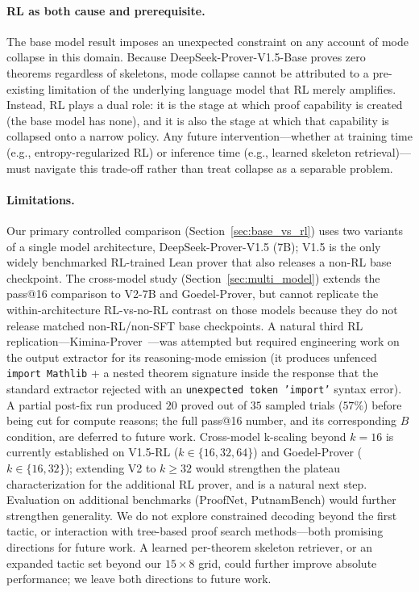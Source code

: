 \documentclass{article}
\begin{document}
\paragraph{RL as both cause and prerequisite.}
The base model result imposes an unexpected constraint on any account of mode collapse in this domain. Because DeepSeek-Prover-V1.5-Base proves zero theorems regardless of skeletons, mode collapse cannot be attributed to a pre-existing limitation of the underlying language model that RL merely amplifies. Instead, RL plays a dual role: it is the stage at which proof capability is created (the base model has none), and it is also the stage at which that capability is collapsed onto a narrow policy. Any future intervention---whether at training time (e.g., entropy-regularized RL) or inference time (e.g., learned skeleton retrieval)---must navigate this trade-off rather than treat collapse as a separable problem.

\paragraph{Limitations.}
Our primary controlled comparison (Section~\ref{sec:base_vs_rl}) uses two variants of a single model architecture, DeepSeek-Prover-V1.5 (7B); V1.5 is the only widely benchmarked RL-trained Lean prover that also releases a non-RL base checkpoint. The cross-model study (Section~\ref{sec:multi_model}) extends the pass@16 comparison to V2-7B and Goedel-Prover, but cannot replicate the within-architecture RL-vs-no-RL contrast on those models because they do not release matched non-RL/non-SFT base checkpoints. A natural third RL replication---Kimina-Prover~\cite{wang2025kimina}---was attempted but required engineering work on the output extractor for its reasoning-mode emission (it produces unfenced \texttt{import Mathlib} + a nested theorem signature inside the response that the standard extractor rejected with an \texttt{unexpected token 'import'} syntax error). A partial post-fix run produced $20$ proved out of $35$ sampled trials ($57\%$) before being cut for compute reasons; the full pass@16 number, and its corresponding $B$ condition, are deferred to future work. Cross-model k-scaling beyond $k{=}16$ is currently established on V1.5-RL ($k \in \{16,32,64\}$) and Goedel-Prover ($k \in \{16,32\}$); extending V2 to $k \geq 32$ would strengthen the plateau characterization for the additional RL prover, and is a natural next step. Evaluation on additional benchmarks (ProofNet, PutnamBench) would further strengthen generality. We do not explore constrained decoding beyond the first tactic, or interaction with tree-based proof search methods---both promising directions for future work. A learned per-theorem skeleton retriever, or an expanded tactic set beyond our $15 \times 8$ grid, could further improve absolute performance; we leave both directions to future work.
\end{document}
